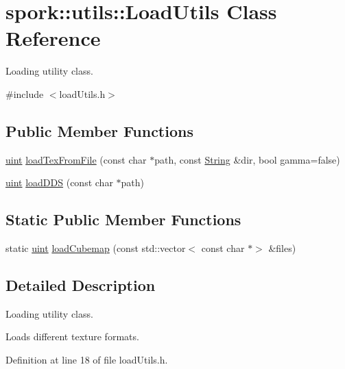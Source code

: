 \hypertarget{classspork_1_1utils_1_1_load_utils}{}\section{spork\+:\+:utils\+:\+:Load\+Utils Class Reference}
\label{classspork_1_1utils_1_1_load_utils}


Loading utility class.  




{\ttfamily \#include $<$load\+Utils.\+h$>$}

\subsection*{Public Member Functions}
\begin{DoxyCompactItemize}
\item 
\hyperlink{defines_8h_a91ad9478d81a7aaf2593e8d9c3d06a14}{uint} \hyperlink{classspork_1_1utils_1_1_load_utils_a97f919497ca7a1f6ed0c67da836a02e0}{load\+Tex\+From\+File} (const char $\ast$path, const \hyperlink{my_string_8h_afbeda3fd1bdc8c37d01bdf9f5c8274ff}{String} \&dir, bool gamma=false)
\item 
\hyperlink{defines_8h_a91ad9478d81a7aaf2593e8d9c3d06a14}{uint} \hyperlink{classspork_1_1utils_1_1_load_utils_a8311cd2ff5fab52499df22a315e742d1}{load\+D\+DS} (const char $\ast$path)
\end{DoxyCompactItemize}
\subsection*{Static Public Member Functions}
\begin{DoxyCompactItemize}
\item 
static \hyperlink{defines_8h_a91ad9478d81a7aaf2593e8d9c3d06a14}{uint} \hyperlink{classspork_1_1utils_1_1_load_utils_a1adb91ce998fad4f9e86622463f79d2a}{load\+Cubemap} (const std\+::vector$<$ const char $\ast$$>$ \&files)
\end{DoxyCompactItemize}


\subsection{Detailed Description}
Loading utility class. 

Loads different texture formats. 

Definition at line 18 of file load\+Utils.\+h.



